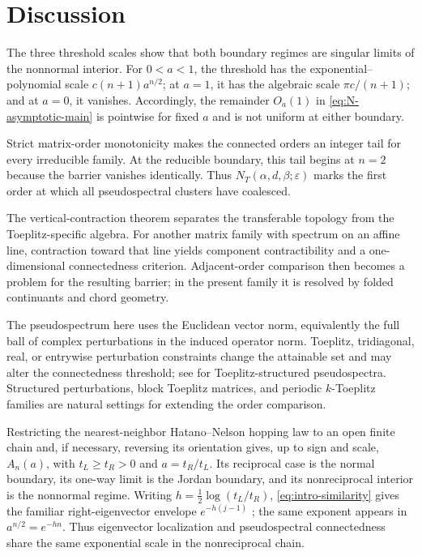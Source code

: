 \documentclass[10pt,twoside]{siamart1116}
\numberwithin{equation}{section}
\begin{document}
\section{Discussion}\label{sec:discussion}

The three threshold scales show that both boundary regimes are singular
limits of the nonnormal interior.  For \(0<a<1\), the threshold has the
exponential--polynomial scale \(c(n+1)a^{n/2}\); at \(a=1\), it has the
algebraic scale \(\pi c/(n+1)\); and at \(a=0\), it vanishes.  Accordingly,
the remainder \(O_a(1)\) in \eqref{eq:N-asymptotic-main} is pointwise for
fixed \(a\) and is not uniform at either boundary.

Strict matrix-order monotonicity makes the connected orders an integer tail
for every irreducible family.  At the reducible boundary, this tail begins at
\(n=2\) because the barrier vanishes identically.  Thus
\(N_T(\alpha,d,\beta;\varepsilon)\) marks the first order at which all
pseudospectral clusters have coalesced.

The vertical-contraction theorem separates the transferable topology from
the Toeplitz-specific algebra.  For another matrix family with spectrum on an
affine line, contraction toward that line yields component contractibility
and a one-dimensional connectedness criterion.  Adjacent-order comparison
then becomes a problem for the resulting barrier; in the present family it is
resolved by folded continuants and chord geometry.

The pseudospectrum here uses the Euclidean vector norm, equivalently the full
ball of complex perturbations in the induced operator norm.  Toeplitz,
tridiagonal, real, or entrywise perturbation constraints change the attainable
set and may alter the connectedness threshold; see
\cite{ButtaGuglielmiNoschese2012} for Toeplitz-structured pseudospectra.
Structured perturbations, block Toeplitz matrices, and periodic
\(k\)-Toeplitz families are natural settings for extending the order
comparison.

Restricting the nearest-neighbor Hatano--Nelson hopping law
\cite{HatanoNelson1996,HatanoNelson1997} to an open finite chain and, if
necessary, reversing its orientation gives, up to sign and scale,
\(A_n(a)\), with \(t_L\geq t_R>0\) and \(a=t_R/t_L\).  Its reciprocal
case is the normal boundary, its one-way limit is the Jordan boundary, and
its nonreciprocal interior is the nonnormal regime.  Writing
\(h=\tfrac12\log(t_L/t_R)\), \eqref{eq:intro-similarity} gives the familiar
right-eigenvector envelope \(e^{-h(j-1)}\) \cite{AmmariEtAl2024}; the same
exponent appears in \(a^{n/2}=e^{-hn}\).  Thus eigenvector localization and
pseudospectral connectedness share the same exponential scale in the
nonreciprocal chain.
\end{document}
